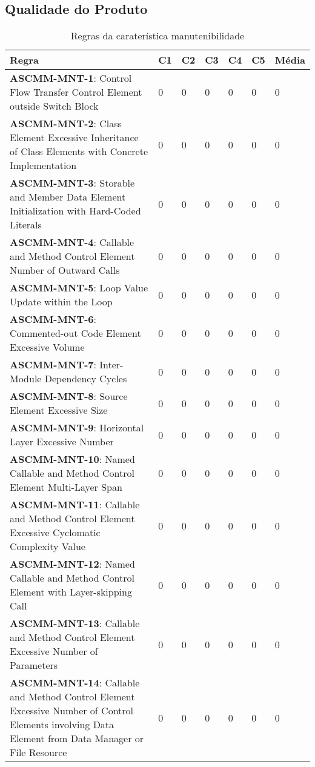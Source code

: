\documentclass[openany,10pt,a4paper]{article}
\begin{document}
\subsection{Qualidade do Produto}
\begin{table}[h]
	\centering
	\caption{Regras da caraterística manutenibilidade}
	\begin{tabular}{|p{3in}|p{0.3in}|p{0.3in}|p{0.3in}|p{0.3in}|p{0.3in}|p{0.4in}|}
		\hline	
		\textbf{Regra} & \textbf{C1} & \textbf{C2} & \textbf{C3} & \textbf{C4} & \textbf{C5} & \textbf{Média} \\ \hline
		\textbf{ASCMM-MNT-1}: Control Flow Transfer Control Element outside Switch Block & 0 & 0 & 0 & 0 & 0 & 0 \\ \hline
\textbf{ASCMM-MNT-2}: Class Element Excessive Inheritance of Class Elements with Concrete Implementation & 0 & 0 & 0 & 0 & 0 & 0 \\ \hline
\textbf{ASCMM-MNT-3}: Storable and Member Data Element Initialization with Hard-Coded Literals & 0 & 0 & 0 & 0 & 0 & 0 \\ \hline
\textbf{ASCMM-MNT-4}: Callable and Method Control Element Number of Outward Calls & 0 & 0 & 0 & 0 & 0 & 0 \\ \hline
\textbf{ASCMM-MNT-5}: Loop Value Update within the Loop & 0 & 0 & 0 & 0 & 0 & 0 \\ \hline
\textbf{ASCMM-MNT-6}: Commented-out Code Element Excessive Volume & 0 & 0 & 0 & 0 & 0 & 0 \\ \hline
\textbf{ASCMM-MNT-7}: Inter-Module Dependency Cycles & 0 & 0 & 0 & 0 & 0 & 0 \\ \hline
\textbf{ASCMM-MNT-8}: Source Element Excessive Size & 0 & 0 & 0 & 0 & 0 & 0 \\ \hline
\textbf{ASCMM-MNT-9}: Horizontal Layer Excessive Number & 0 & 0 & 0 & 0 & 0 & 0 \\ \hline
\textbf{ASCMM-MNT-10}: Named Callable and Method Control Element Multi-Layer Span & 0 & 0 & 0 & 0 & 0 & 0 \\ \hline
\textbf{ASCMM-MNT-11}: Callable and Method Control Element Excessive Cyclomatic Complexity Value & 0 & 0 & 0 & 0 & 0 & 0 \\ \hline
\textbf{ASCMM-MNT-12}: Named Callable and Method Control Element with Layer-skipping Call & 0 & 0 & 0 & 0 & 0 & 0 \\ \hline
\textbf{ASCMM-MNT-13}: Callable and Method Control Element Excessive Number of Parameters & 0 & 0 & 0 & 0 & 0 & 0 \\ \hline
\textbf{ASCMM-MNT-14}: Callable and Method Control Element Excessive Number of Control Elements involving Data Element from Data Manager or File Resource & 0 & 0 & 0 & 0 & 0 & 0 \\ \hline

\end{tabular}
\end{table}
\end{document}
